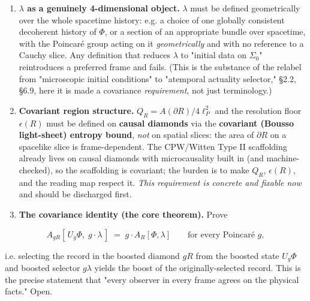 \documentclass[11pt,a4paper]{article}
\begin{document}
\begin{enumerate}
  \item \textbf{$\lambda$ as a genuinely 4-dimensional object.} $\lambda$ must be defined geometrically over the whole spacetime history: e.g. a choice of one globally consistent decoherent history of $\Phi$, or a section of an appropriate bundle over spacetime, with the Poincaré group acting on it \emph{geometrically} and with no reference to a Cauchy slice. Any definition that reduces $\lambda$ to "initial data on $\Sigma_0$" reintroduces a preferred frame and fails. (This is the substance of the relabel from "microscopic initial conditions" to "atemporal actuality selector," §2.2, §6.9, here it is made a covariance \emph{requirement}, not just terminology.)
  \item \textbf{Covariant region structure.} $Q_R = A(\partial R)/4\ell_P^2$ and the resolution floor $\epsilon(R)$ must be defined on \textbf{causal diamonds} via the \textbf{covariant (Bousso light-sheet) entropy bound}, \emph{not} on spatial slices: the area of $\partial R$ on a spacelike slice is frame-dependent. The CPW/Witten Type II scaffolding already lives on causal diamonds with microcausality built in (and machine-checked), so the scaffolding is covariant; the burden is to make $Q_R$, $\epsilon(R)$, and the reading map respect it. \emph{This requirement is concrete and fixable now} and should be discharged first.
  \item \textbf{The covariance identity (the core theorem).} Prove
\end{enumerate}

\[
A_{gR}[\,U_g\Phi,\; g\!\cdot\!\lambda\,] \;=\; g\cdot A_R[\Phi,\lambda] \qquad \text{for every Poincaré } g,
\]

i.e. selecting the record in the boosted diamond $gR$ from the boosted state $U_g\Phi$ and boosted selector $g\lambda$ yields the boost of the originally-selected record. This is the precise statement that "every observer in every frame agrees on the physical facts." Open.
\end{document}
